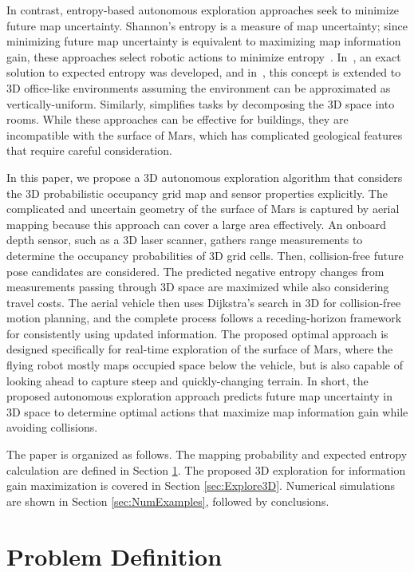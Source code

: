\documentclass[conf]{new-aiaa}
\begin{document}
In contrast, entropy-based autonomous exploration approaches seek to minimize future map uncertainty. Shannon's entropy is a measure of map uncertainty; since minimizing future map uncertainty is equivalent to maximizing map information gain, these approaches select robotic actions to minimize entropy~\cite{StaGriBur05}. In~\cite{KauAiLee16}, an exact solution to expected entropy was developed, and in~\cite{KauTakAiLee18}, this concept is extended to 3D office-like environments assuming the environment can be approximated as vertically-uniform. Similarly, \cite{MauDakPet14} simplifies tasks by decomposing the 3D space into rooms. While these approaches can be effective for buildings, they are incompatible with the surface of Mars, which has complicated geological features that require careful consideration.

In this paper, we propose a 3D autonomous exploration algorithm that considers the 3D probabilistic occupancy grid map and sensor properties explicitly. The complicated and uncertain geometry of the surface of Mars is captured by aerial mapping because this approach can cover a large area effectively. An onboard depth sensor, such as a 3D laser scanner, gathers range measurements to determine the occupancy probabilities of 3D grid cells. Then, collision-free future pose candidates are considered. The predicted negative entropy changes from measurements passing through 3D space are maximized while also considering travel costs. The aerial vehicle then uses Dijkstra's search in 3D for collision-free motion planning, and the complete process follows a receding-horizon framework for consistently using updated information. The proposed optimal approach is designed specifically for real-time exploration of the surface of Mars, where the flying robot mostly maps occupied space below the vehicle, but is also capable of looking ahead to capture steep and quickly-changing terrain. In short, the proposed autonomous exploration approach predicts future map uncertainty in 3D space to determine optimal actions that maximize map information gain while avoiding collisions.

The paper is organized as follows. The mapping probability and expected entropy calculation are defined in Section \ref{sec:ProbDef}. The proposed 3D exploration for information gain maximization is covered in Section \ref{sec:Explore3D}. Numerical simulations are shown in Section \ref{sec:NumExamples}, followed by conclusions.

\section{Problem Definition}
\label{sec:ProbDef}
\end{document}
